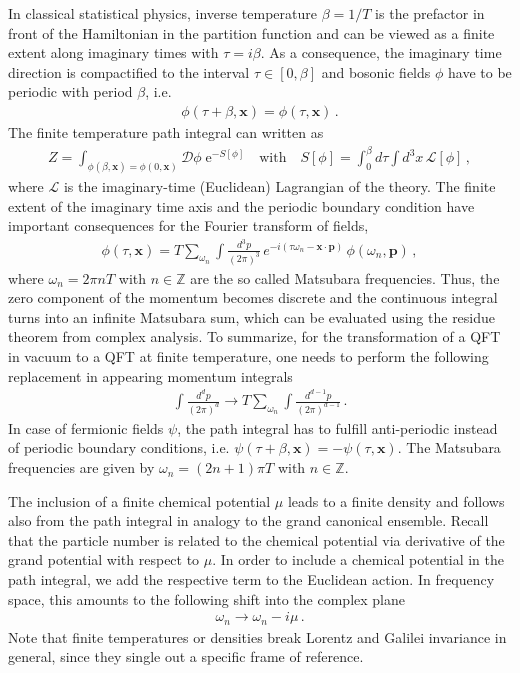 In classical statistical physics, inverse temperature $\beta=1/T$ is the prefactor in front of the Hamiltonian in the partition function and can be viewed as a finite extent along imaginary times with $\tau=i\beta$. As a consequence, the imaginary time direction is compactified to the interval $\tau\in[0,\beta]$ and bosonic fields $\phi$ have to be periodic with period $\beta$, i.e.
%
\begin{align}
	\label{eq:periodic-condition}
	\phi(\tau+\beta,\bm{x})=\phi(\tau,\bm{x}) \,.
\end{align}
%
The finite temperature path integral can written as
%
\begin{align}
	\label{eq:finite-temperature-path-integral}
	Z = \int_{\phi(\beta,\bm{x})=\phi(0,\bm{x})} \mathcal{D}\phi\; \mathrm{e}^{-S[\phi]} \quad \mathrm{with} \quad S[\phi]=\int_0^{\beta}d\tau\int d^3x\, \mathcal{L}[\phi] \,,
\end{align}
%
where $\mathcal{L}$ is the imaginary-time (Euclidean) Lagrangian of the theory. The finite extent of the imaginary time axis and the periodic boundary condition have important consequences for the Fourier transform of fields,
%
\begin{align}
	\label{eq:matsubara-fourier-transform}
	\phi(\tau,\bm{x}) = T\sum_{\omega_n}\int\frac{d^3p}{(2\pi)^3}\, e^{-i(\tau\omega_n-\bm{x}\cdot\bm{p})}\, \phi(\omega_n,\bm{p})  \,,
\end{align}
%
where $\omega_n=2\pi n T$ with $n\in\mathbb{Z}$ are the so called Matsubara frequencies. Thus, the zero component of the momentum becomes discrete and the continuous integral turns into an infinite Matsubara sum, which can be evaluated using the residue theorem from complex analysis. To summarize, for the transformation of a QFT in vacuum to a QFT at finite temperature, one needs to perform the following replacement in appearing momentum integrals
%
\begin{align}
	\label{eq:finite-temperature-integrals}
	\int\frac{d^dp}{(2\pi)^d} \rightarrow T\sum_{\omega_n}\int\frac{d^{d-1}p}{(2\pi)^{d-1}}  \,.
\end{align}
%
In case of fermionic fields $\psi$, the path integral has to fulfill anti-periodic instead of periodic boundary conditions, i.e. $\psi(\tau+\beta,\bm{x})=-\psi(\tau,\bm{x})$. The Matsubara frequencies are given by $\omega_n=(2n+1)\pi T$ with $n\in\mathbb{Z}$.

The inclusion of a finite chemical potential $\mu$ leads to a finite density and follows also from the path integral in analogy to the grand canonical ensemble. Recall that the particle number is related to the chemical potential via derivative of the grand potential with respect to $\mu$. In order to include a chemical potential in the path integral, we add the respective term to the Euclidean action. In frequency space, this amounts to the following shift into the complex plane
%
\begin{align}
	\label{eq:chemical-potential}
	\omega_n \rightarrow \omega_n - i\mu \,.
\end{align}
%
Note that finite temperatures or densities break Lorentz and Galilei invariance in general, since they single out a specific frame of reference.

